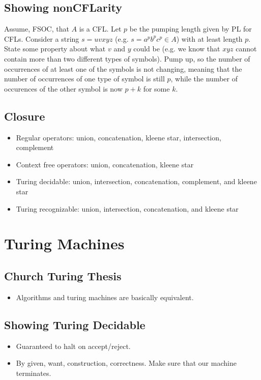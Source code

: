 \documentclass{article}
\begin{document}
\subsection{Showing nonCFLarity}
Assume, FSOC, that $A$ is a CFL. Let $p$ be the pumping length given by PL for CFLs. Consider a string $s=uvxyz$ (e.g. $s=a^p b^p c^p \in A$) with at least length $p$. State some property about what $v$ and $y$ could be (e.g. we know that $xyz$ cannot contain more than two different types of symbols). Pump up, so the number of occurrences of at least one of the symbols is not changing, meaning that the number of occurrences of one type of symbol is still $p$, while the number of occurences of the other symbol is now $p+k$ for some $k$.

\subsection{Closure}
\begin{itemize}
    \item Regular operators: union, concatenation, kleene star, intersection, complement
    \item Context free operators: union, concatenation, kleene star
    \item Turing decidable: union, intersection, concatenation, complement, and kleene star
    \item Turing recognizable: union, intersection, concatenation, and kleene star
\end{itemize}

\section{Turing Machines}
\subsection{Church Turing Thesis}
\begin{itemize}
    \item Algorithms and turing machines are basically equivalent.
\end{itemize}
\subsection{Showing Turing Decidable}
\begin{itemize}
    \item Guaranteed to halt on accept/reject.
    \item By given, want, construction, correctness. Make sure that our machine terminates.
\end{itemize}
\end{document}
